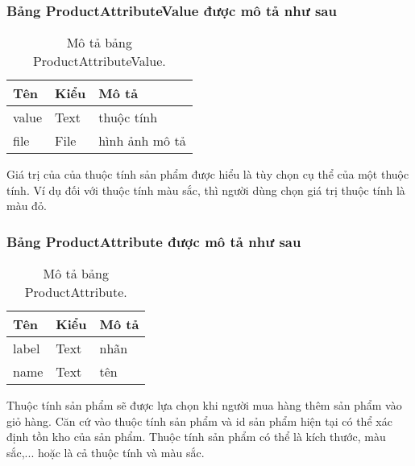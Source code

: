 \subsubsection{Bảng ProductAttributeValue được mô tả như sau}
\begin{table}[!htbp]\fontsize{13px}{13px}\selectfont\justifying
\begin{center}
\caption{Mô tả bảng ProductAttributeValue.}
\begin{tabularx}{0.6\textwidth}{ |l|l|X| } 
\hline
Tên & Kiểu & Mô tả \\
\hline
value & Text & thuộc tính \\
file & File & hình ảnh mô tả \\ 
\hline
\end{tabularx}
\label{table:ProductAttributeValue}
\end{center}
Giá trị của của thuộc tính sản phẩm được hiểu là tùy chọn cụ thể của một thuộc tính. Ví dụ đối với thuộc tính màu sắc, thì người dùng chọn giá trị thuộc tính là màu đỏ.
\end{table}

\subsubsection{Bảng ProductAttribute được mô tả như sau}
\begin{table}[!htbp]\fontsize{13px}{13px}\selectfont\justifying
\begin{center}
\caption{Mô tả bảng ProductAttribute.}
\begin{tabularx}{0.6\textwidth}{ |l|l|X| } 
\hline
Tên & Kiểu & Mô tả \\
\hline
label & Text & nhãn \\
name & Text & tên \\
\hline
\end{tabularx}
\label{table:ProductAttribute}
\end{center}
Thuộc tính sản phẩm sẽ được lựa chọn khi người mua hàng thêm sản phẩm vào giỏ hàng. Căn cứ vào thuộc tính sản phẩm và id sản phẩm hiện tại có thể xác định tồn kho của sản phẩm.
Thuộc tính sản phẩm có thể là kích thước, màu sắc,... hoặc là cả thuộc tính và màu sắc.
\end{table}

